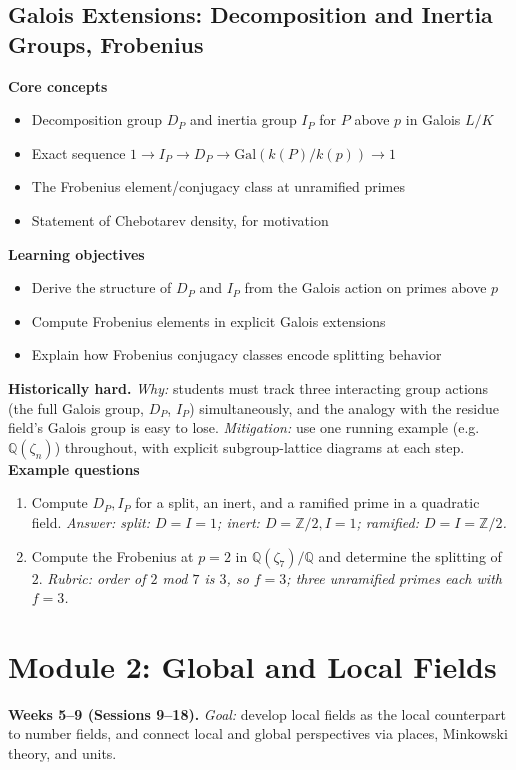 \documentclass[11pt]{article}
\newcommand{\Q}{\mathbb{Q}}
\newcommand{\Z}{\mathbb{Z}}
\newcommand{\Gal}{\mathrm{Gal}}
\begin{document}
\subsection{Galois Extensions: Decomposition and Inertia Groups, Frobenius}
\textbf{Core concepts}
\begin{itemize}[noitemsep]
  \item Decomposition group $D_P$ and inertia group $I_P$ for $P$ above $p$ in Galois $L/K$
  \item Exact sequence $1 \to I_P \to D_P \to \Gal(k(P)/k(p)) \to 1$
  \item The Frobenius element/conjugacy class at unramified primes
  \item Statement of Chebotarev density, for motivation
\end{itemize}
\textbf{Learning objectives}
\begin{itemize}[noitemsep]
  \item Derive the structure of $D_P$ and $I_P$ from the Galois action on primes above $p$
  \item Compute Frobenius elements in explicit Galois extensions
  \item Explain how Frobenius conjugacy classes encode splitting behavior
\end{itemize}
\textbf{Historically hard.} \emph{Why:} students must track three interacting group actions (the full Galois group, $D_P$, $I_P$) simultaneously, and the analogy with the residue field's Galois group is easy to lose. \emph{Mitigation:} use one running example (e.g.\ $\Q(\zeta_n)$) throughout, with explicit subgroup-lattice diagrams at each step.
\textbf{Example questions}
\begin{enumerate}[noitemsep]
  \item[Q1 (foundational).] Compute $D_P, I_P$ for a split, an inert, and a ramified prime in a quadratic field. \emph{Answer: split: $D=I=1$; inert: $D=\Z/2, I=1$; ramified: $D=I=\Z/2$.}
  \item[Q2 (advanced).] Compute the Frobenius at $p=2$ in $\Q(\zeta_7)/\Q$ and determine the splitting of $2$. \emph{Rubric: order of $2$ mod $7$ is $3$, so $f=3$; three unramified primes each with $f=3$.}
\end{enumerate}

\section{Module 2: Global and Local Fields}
\textbf{Weeks 5--9 (Sessions 9--18).} \textit{Goal:} develop local fields as the local counterpart to number fields, and connect local and global perspectives via places, Minkowski theory, and units.
\end{document}
